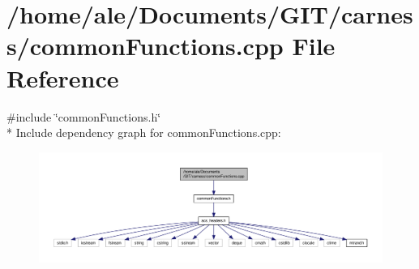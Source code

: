 \hypertarget{a00069}{\section{/home/ale/\-Documents/\-G\-I\-T/carness/common\-Functions.cpp File Reference}
\label{a00069}
}
{\ttfamily \#include \char`\"{}common\-Functions.\-h\char`\"{}}\\*
Include dependency graph for common\-Functions.\-cpp\-:\nopagebreak
\begin{figure}[H]
\begin{center}
\leavevmode
\includegraphics[width=350pt]{a00123}
\end{center}
\end{figure}

